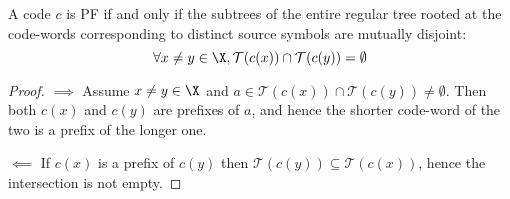 \documentclass[toc]{../cs-classes/cs-classes}
\begin{document}
\begin{lemma}
    A code $c$ is PF if and only if the subtrees of the entire regular tree rooted at the code-words corresponding to distinct source symbols are mutually disjoint:
    \begin{equation*}
        \forall x\neq y\in \X, \mathcal{T}(c(x))\cap\mathcal{T}(c(y))=\emptyset
    \end{equation*}
\end{lemma}

\begin{proof}
    $\implies$
    Assume $x\neq y\in\X$ and $a\in \mathcal{T}(c(x))\cap\mathcal{T}(c(y))\neq\emptyset$. Then both $c(x)$ and $c(y)$ are prefixes of $a$, and hence the shorter code-word of the two is a prefix of the longer one.

    $\impliedby$ If $c(x)$ is a prefix of $c(y)$ then $\mathcal{T}(c(y))\subseteq \mathcal{T}(c(x))$, hence the intersection is not empty.    
\end{proof}
\end{document}
